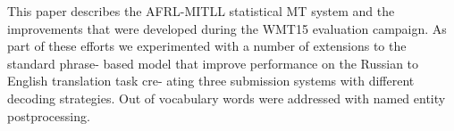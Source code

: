 This paper describes the AFRL-MITLL statistical MT system and the improvements that were developed during the WMT15 evaluation campaign. As part of these efforts we experimented with a number of extensions to the standard phrase- based model that improve performance on the Russian to English translation task cre- ating three submission systems with different decoding strategies. Out of vocabulary words were addressed with named entity postprocessing.

